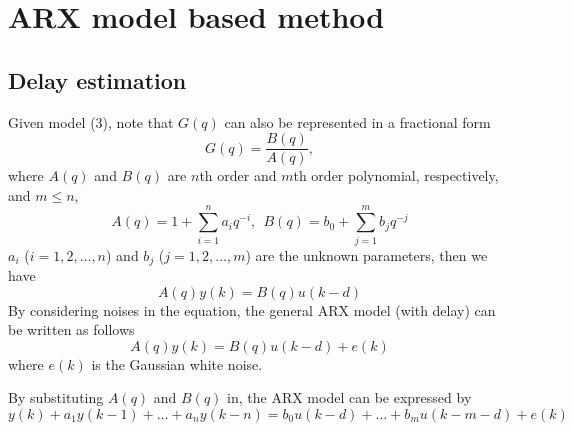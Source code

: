 \documentclass[letterpaper, 12 pt, Journal, onecolumn]{ieeeconf}  %
\begin{document}
\section{ARX model based method}
	\subsection{Delay estimation}
Given model (3), note that $G(q)$ can also be represented in a fractional form 
$$ G(q)=\frac{B(q)}{A(q)},$$
where $A(q)$ and $B(q)$ are $n$th order and $m$th order polynomial, respectively, and $m\le n$, 
$$A(q)= 1+\sum\limits_{i=1}^n a_iq^{-i}, ~~B(q) = b_0+\sum\limits_{j=1}^m b_jq^{-j}$$
$a_i$ ($i=1,2,\dots,n$) and $b_j$ ($j=1,2,\dots,m$) are the unknown parameters, then we have 
$$
A(q)y(k)=B(q)u(k-d)
$$
By considering noises in the equation, the general ARX model (with delay) can be written as follows
\begin{equation} \label{eq:ARX}
	A(q)y(k)=B(q)u(k-d)+e(k)
\end{equation}
where $e(k)$ is the Gaussian white noise.


By substituting $A(q)$ and $B(q)$ in, the ARX model can be expressed by
\begin{equation}\label{eq:ARX_reformat}
y(k)+a_1y(k-1)+\ldots+a_ny(k-n)=b_0u(k-d)+\ldots+b_mu(k-m-d)+e(k)
\end{equation}
	
\end{document}
